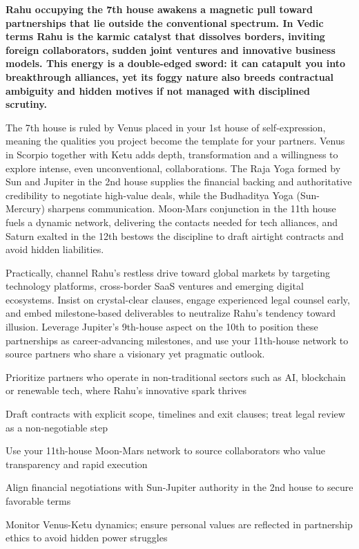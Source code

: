 {\fontsize{9.5}{13.8}\selectfont\bfseries\color{DeepSlate} Rahu occupying the 7th house awakens a magnetic pull toward partnerships that lie outside the conventional spectrum. In Vedic terms Rahu is the karmic catalyst that dissolves borders, inviting foreign collaborators, sudden joint ventures and innovative business models. This energy is a double-edged sword: it can catapult you into breakthrough alliances, yet its foggy nature also breeds contractual ambiguity and hidden motives if not managed with disciplined scrutiny.}\par\vspace{2mm}

{\fontsize{9}{13}\selectfont The 7th house is ruled by Venus placed in your 1st house of self-expression, meaning the qualities you project become the template for your partners. Venus in Scorpio together with Ketu adds depth, transformation and a willingness to explore intense, even unconventional, collaborations. The Raja Yoga formed by Sun and Jupiter in the 2nd house supplies the financial backing and authoritative credibility to negotiate high-value deals, while the Budhaditya Yoga (Sun-Mercury) sharpens communication. Moon-Mars conjunction in the 11th house fuels a dynamic network, delivering the contacts needed for tech alliances, and Saturn exalted in the 12th bestows the discipline to draft airtight contracts and avoid hidden liabilities.}\par\vspace{1.8mm}

{\fontsize{9}{13}\selectfont Practically, channel Rahu's restless drive toward global markets by targeting technology platforms, cross-border SaaS ventures and emerging digital ecosystems. Insist on crystal-clear clauses, engage experienced legal counsel early, and embed milestone-based deliverables to neutralize Rahu's tendency toward illusion. Leverage Jupiter's 9th-house aspect on the 10th to position these partnerships as career-advancing milestones, and use your 11th-house network to source partners who share a visionary yet pragmatic outlook.}\par\vspace{1.8mm}

\begin{diamondlist}
  \item {\fontsize{8.5}{12}\selectfont Prioritize partners who operate in non-traditional sectors such as AI, blockchain or renewable tech, where Rahu's innovative spark thrives}
  \item {\fontsize{8.5}{12}\selectfont Draft contracts with explicit scope, timelines and exit clauses; treat legal review as a non-negotiable step}
  \item {\fontsize{8.5}{12}\selectfont Use your 11th-house Moon-Mars network to source collaborators who value transparency and rapid execution}
  \item {\fontsize{8.5}{12}\selectfont Align financial negotiations with Sun-Jupiter authority in the 2nd house to secure favorable terms}
  \item {\fontsize{8.5}{12}\selectfont Monitor Venus-Ketu dynamics; ensure personal values are reflected in partnership ethics to avoid hidden power struggles}
\end{diamondlist}

